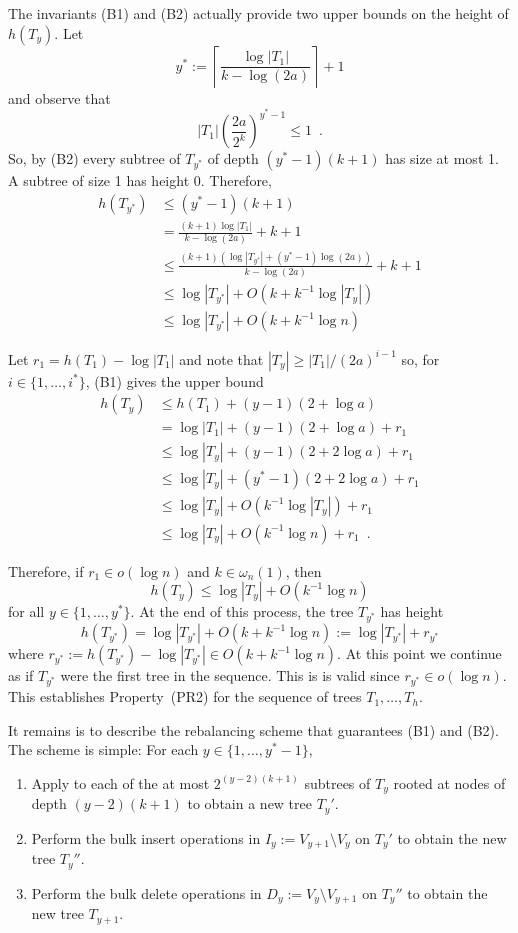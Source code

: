 \documentclass[kpfonts]{patmorin}
\begin{document}
The invariants (B1) and (B2) actually provide two upper bounds on the height of $h(T_y)$.  Let
\[
   y^* := \left\lceil \frac{\log|T_1|}{k-\log(2a)}\right\rceil + 1
\]
and observe that
\[
   |T_{1}|\left(\frac{2a}{2^k}\right)^{y^*-1} \le 1 \enspace .
\]
So, by (B2) every subtree of $T_{y^*}$ of depth $(y^*-1)(k+1)$ has size at most 1.  A subtree of size 1 has height 0.  Therefore,
\begin{align*}
  h(T_{y^*}) & \le (y^*-1)(k+1) \\
  & = \frac{(k+1)\log|T_1|}{k-\log(2a)} + k+1 \\
  & \le \frac{(k+1)(\log |T_{y^*}| + (y^*-1)\log(2a))}{k-\log(2a)} + k+1 \\
  & \le \log|T_{y^*}| + O(k + k^{-1}\log |T_y|) \\
  & \le \log |T_{y^*}| + O(k + k^{-1}\log n)
\end{align*}

Let $r_1=h(T_1)-\log |T_1|$ and note that $|T_y|\ge |T_1|/(2a)^{i-1}$ so, for $i\in\{1,\ldots,i^*\}$, (B1) gives the upper bound
\begin{align}
     h(T_y) & \le h(T_1) + (y-1)(2+\log a) \nonumber \\
            &= \log|T_1| + (y-1)(2+\log a) + r_1 \nonumber \\
            &\le \log |T_y| + (y-1)(2+2\log a) + r_1 \nonumber \\
            &\le \log |T_y| + (y^*-1)(2+2\log a) + r_1 \nonumber \\
            &\le \log |T_y| + O(k^{-1}\log|T_y|) + r_1 \nonumber \\
            &\le \log |T_y| + O(k^{-1}\log n) + r_1 \enspace .
\end{align}

Therefore, if $r_1\in o(\log n)$ and $k\in\omega_{n}(1)$, then
\[
  h(T_y) \le \log |T_y| + O(k^{-1}\log n) 
\]
for all $y\in\{1,\ldots,y^*\}$. At the end of this process, the tree $T_{y^*}$ has height
\[
    h(T_{y^*})= \log |T_{y^*}| + O(k + k^{-1}\log n) := \log |T_{y^*}| + r_{y^*}
\]
where $r_{y^*}:=h(T_{y^*})-\log|T_{y^*}|\in O(k + k^{-1}\log n)$.  At this point we continue as if $T_{y^*}$ were the first tree in the sequence.  This is is valid since $r_{y^*}\in o(\log n)$.  This establishes Property~(PR2) for the sequence of trees $T_1,\ldots,T_h$.  

It remains is to describe the rebalancing scheme that guarantees (B1) and (B2).  The scheme is simple: For each $y\in\{1,\ldots,y^*-1\}$,
\begin{enumerate}[(S1)]
  \item Apply  to each of the at most $2^{(y-2)(k+1)}$ subtrees of $T_y$ rooted at nodes of depth $(y-2)(k+1)$ to obtain a new tree $T_y'$.
  \item Perform the bulk insert operations in $I_y:=V_{y+1}\setminus V_y$ on $T_y'$ to obtain the new tree $T_y''$.
  \item Perform the bulk delete operations in $D_y:=V_{y}\setminus V_{y+1}$ on $T_y''$ to obtain the new tree $T_{y+1}$.
\end{enumerate}
\end{document}
